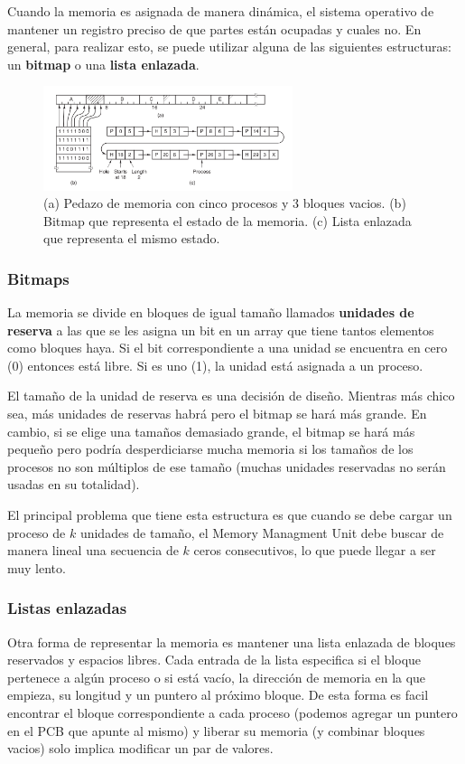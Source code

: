 Cuando la memoria es asignada de manera dinámica, el sistema operativo de mantener un registro preciso de que partes están ocupadas y cuales no. En general, para realizar esto, se puede utilizar alguna de las siguientes estructuras: un \textbf{bitmap} o una \textbf{lista enlazada}.

\begin{figure}[h]
	\centering
	\includegraphics[width=0.65\textwidth
]{imagenes/bitmap-enlazada}
	\caption[Pedazo de memoria con cinco procesos y 3 bloques vacios.]{(a) Pedazo de memoria con cinco procesos y 3 bloques vacios. (b) Bitmap que representa el estado de la memoria. (c) Lista enlazada que representa el mismo estado.}
	\label{fig:bitmap-enlazada}
\end{figure}


\subsubsection{Bitmaps} 
La memoria se divide en bloques de igual tamaño llamados \textbf{unidades de reserva } a las que se les asigna un bit en un array que tiene tantos elementos como bloques haya. Si el bit correspondiente a una unidad se encuentra en cero (0) entonces está libre. Si es uno (1), la unidad está asignada a un proceso.

El tamaño de la unidad de reserva es una decisión de diseño. Mientras más chico sea, más unidades de reservas habrá pero el bitmap se hará más grande. En cambio, si se elige una tamaños demasiado grande, el bitmap se hará más pequeño pero podría desperdiciarse mucha memoria si los tamaños de los procesos no son múltiplos de ese tamaño (muchas unidades reservadas no serán usadas en su totalidad).

El principal problema que tiene esta estructura es que cuando se debe cargar un proceso de $k$ unidades de tamaño, el Memory Managment Unit debe buscar de manera lineal una secuencia de $k$ ceros consecutivos, lo que puede llegar a ser muy lento.

\subsubsection{Listas enlazadas} Otra forma de representar la memoria es mantener una lista enlazada de bloques reservados y espacios libres. Cada entrada de la lista especifica si el bloque pertenece a algún proceso o si está vacío, la dirección de memoria en la que empieza, su longitud y un puntero al próximo bloque. De esta forma es facil encontrar el bloque correspondiente a cada proceso (podemos agregar un puntero en el PCB que apunte al mismo) y liberar su memoria (y combinar bloques vacios) solo implica modificar un par de valores.

